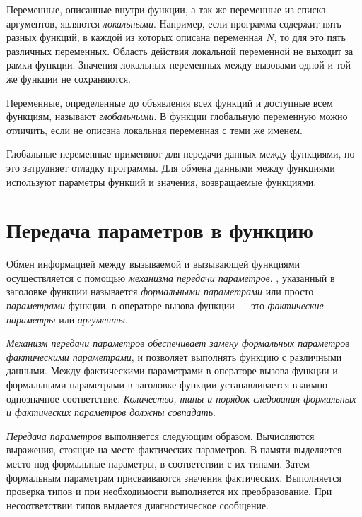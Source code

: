 Переменные, описанные внутри функции, а так же переменные из списка аргументов, являются
\emph{локальными}. Например, если программа содержит пять разных функций, в
каждой из которых описана переменная $N$, то для  это пять различных переменных. Область действия локальной переменной
не выходит за рамки функции. Значения локальных переменных между вызовами одной и той же функции не сохраняются. 

Переменные, определенные до объявления всех функций и доступные всем функциям, называют
\emph{глобальными}. В функции глобальную переменную можно отличить, если не
описана локальная переменная с теми же именем.

Глобальные переменные применяют для передачи данных между функциями, но это затрудняет отладку программы. Для обмена
данными между функциями используют параметры функций и значения, возвращаемые функциями.

\section[Передача параметров в функцию]{Передача параметров в функцию}
Обмен информацией между вызываемой и вызывающей функциями осуществляется с помощью \emph{механизма передачи параметров}. , указанный в
заголовке функции называется \emph{формальными параметрами} или просто
\emph{параметрами} функции.  в операторе вызова функции --- это
\emph{фактические параметры} или \emph{аргументы}. 

\emph{Механизм передачи параметров обеспечивает замену формальных параметров фактическими параметрами}, и
позволяет выполнять функцию с различными данными. Между фактическими параметрами в операторе вызова функции и
формальными параметрами в заголовке функции устанавливается взаимно однозначное соответствие.
\emph{Количество, типы и порядок следования формальных и фактических параметров должны совпадать}.

\emph{Передача параметров} выполняется следующим образом. Вычисляются выражения,
стоящие на месте фактических параметров. В памяти выделяется место под формальные параметры, в соответствии с их
типами. Затем формальным параметрам присваиваются значения фактических. Выполняется проверка типов и при необходимости
выполняется их преобразование. При несоответствии типов выдается диагностическое сообщение. 

